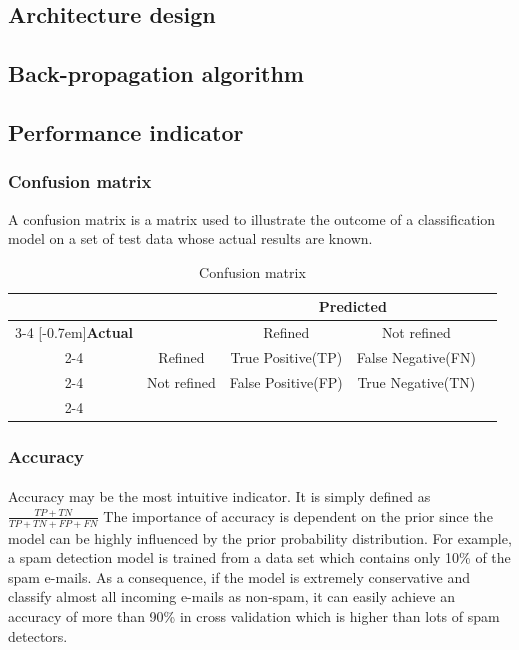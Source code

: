 \subsection{Architecture design}
\subsection{Back-propagation algorithm}





\subsection{Performance indicator}
\subsubsection{Confusion matrix}
A confusion matrix is a matrix used to illustrate the outcome of a classification model on a set of test data whose actual results are known.
    \begin{table}[]
        \centering
        \caption{Confusion matrix}
        \label{my-label}
        \begin{tabular}{ccccc}
                                & & \multicolumn{2}{c}{\textbf{Predicted}}                 &  \\ \cline{3-4}
                                \multirow{3}{*}[-0.7em]{\textbf{Actual}} &
                                & \multicolumn{1}{|c|}{Refined}        & \multicolumn{1}{c|}{Not refined}    &  \\ \cline{2-4}        
                                & \multicolumn{1}{|c}{Refined}     & \multicolumn{1}{|c|}{True Positive(TP)}  & \multicolumn{1}{c|}{False Negative(FN)} &  \\ \cline{2-4}
                                & \multicolumn{1}{|c}{Not refined} & \multicolumn{1}{|c|}{False Positive(FP)} & \multicolumn{1}{c|}{True Negative(TN)}  &  \\ \cline{2-4}
        \end{tabular}
    \end{table}

\subsubsection{Accuracy}
\paragraph{}
Accuracy may be the most intuitive indicator.
It is simply defined as $\frac{TP+TN}{TP+TN+FP+FN}$
The importance of accuracy is dependent on the prior since the model can be highly influenced by the prior probability distribution.
For example, a spam detection model is trained from a data set which contains only 10\% of the spam e-mails.
As a consequence, if the model is extremely conservative and classify almost all incoming e-mails as non-spam, it can easily achieve an accuracy of more than 90\% in cross validation which is higher than lots of spam detectors.

